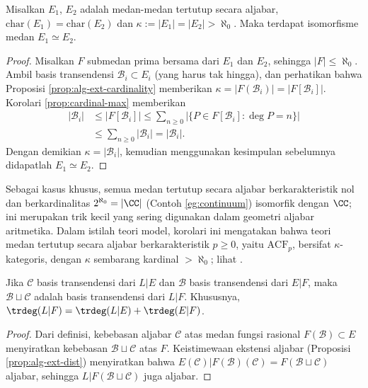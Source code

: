 \begin{corollary}\label{prop:ACF-categoricity}
	Misalkan $E_1$, $E_2$ adalah medan-medan tertutup secara aljabar, $\mathrm{char}(E_1)=\mathrm{char}(E_2)$ dan $\kappa := |E_1| = |E_2| > \aleph_0$. Maka terdapat isomorfisme medan $E_1 \simeq E_2$.
\end{corollary}
\begin{proof}
	Misalkan $F$ submedan prima bersama dari $E_1$ dan $E_2$, sehingga $|F| \leq \aleph_0$. Ambil basis transendensi $\mathcal{B}_i \subset E_i$ (yang harus tak hingga), dan perhatikan bahwa Proposisi \ref{prop:alg-ext-cardinality} memberikan $\kappa = |F(\mathcal{B}_i)| = |F[\mathcal{B}_i]|$. Korolari \ref{prop:cardinal-max} memberikan
	\begin{align*}
		|\mathcal{B}_i| & \leq |F[\mathcal{B}_i]| \leq \sum_{n \geq 0} \left| \{P \in F[\mathcal{B}_i]: \deg P = n \} \right| \\
		& \leq \sum_{n \geq 0} |\mathcal{B}_i| = |\mathcal{B}_i|.
	\end{align*}
	Dengan demikian $\kappa = |\mathcal{B}_i|$, kemudian menggunakan kesimpulan sebelumnya didapatlah $E_1 \simeq E_2$.
\end{proof}
Sebagai kasus khusus, semua medan tertutup secara aljabar berkarakteristik nol dan berkardinalitas $2^{\aleph_0} = |\CC|$ (Contoh \ref{eg:continuum}) isomorfik dengan $\CC$; ini merupakan trik kecil yang sering digunakan dalam geometri aljabar aritmetika. Dalam istilah teori model, korolari ini mengatakan bahwa teori medan tertutup secara aljabar berkarakteristik $p \geq 0$, yaitu $\text{ACF}_p$, bersifat $\kappa$-kategoris, dengan $\kappa$ sembarang kardinal $> \aleph_0$; lihat \cite[\S 6.1.1 dan Bab 8]{Feng17}.  

\begin{proposition}
	Jika $\mathcal{C}$ basis transendensi dari $L|E$ dan $\mathcal{B}$ basis transendensi dari $E|F$, maka $\mathcal{B} \sqcup \mathcal{C}$ adalah basis transendensi dari $L|F$. Khususnya, $\trdeg(L|F) = \trdeg(L|E) + \trdeg(E|F)$.
\end{proposition}
\begin{proof}
	Dari definisi, kebebasan aljabar $\mathcal{C}$ atas medan fungsi rasional $F(\mathcal{B}) \subset E$ menyiratkan kebebasan $\mathcal{B} \sqcup \mathcal{C}$ atas $F$. Keistimewaan ekstensi aljabar (Proposisi \ref{prop:alg-ext-dist}) menyiratkan bahwa $E(\mathcal{C}) | F(\mathcal{B})(\mathcal{C}) = F(\mathcal{B} \sqcup \mathcal{C})$ aljabar, sehingga $L|F(\mathcal{B} \sqcup \mathcal{C})$ juga aljabar.
\end{proof}

